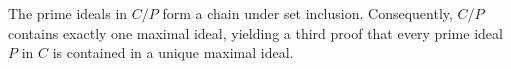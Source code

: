 The prime ideals in $C/P$ form a chain under set inclusion. Consequently, $C/P$ contains exactly one maximal ideal, yielding a third proof that every prime ideal $P$ in $C$ is contained in a unique maximal ideal.
